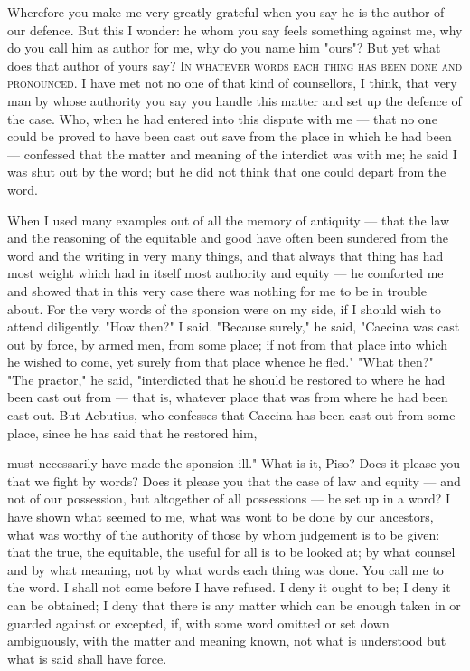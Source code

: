  Wherefore you make me very greatly grateful when you say he is the author of our defence. But this I wonder: he whom you say feels something against me, why do you call him as author for me, why do you name him "ours"? But yet what does that author of yours say? \textsc{In whatever words each thing has been done and pronounced}. I have met not no one of that kind of counsellors, I think, that very man by whose authority you say you handle this matter and set up the defence of the case. Who, when he had entered into this dispute with me --- that no one could be proved to have been cast out save from the place in which he had been --- confessed that the matter and meaning of the interdict was with me; he said I was shut out by the word; but he did not think that one could depart from the word.

 When I used many examples out of all the memory of antiquity --- that the law and the reasoning of the equitable and good have often been sundered from the word and the writing in very many things, and that always that thing has had most weight which had in itself most authority and equity --- he comforted me and showed that in this very case there was nothing for me to be in trouble about. For the very words of the sponsion were on my side, if I should wish to attend diligently. "How then?" I said. "Because surely," he said, "Caecina was cast out by force, by armed men, from some place; if not from that place into which he wished to come, yet surely from that place whence he fled." "What then?" "The praetor," he said, "interdicted that he should be restored to where he had been cast out from --- that is, whatever place that was from where he had been cast out. But Aebutius, who confesses that Caecina has been cast out from some place, since he has said that he restored him,

 must necessarily have made the sponsion ill." What is it, Piso? Does it please you that we fight by words? Does it please you that the case of law and equity --- and not of our possession, but altogether of all possessions --- be set up in a word? I have shown what seemed to me, what was wont to be done by our ancestors, what was worthy of the authority of those by whom judgement is to be given: that the true, the equitable, the useful for all is to be looked at; by what counsel and by what meaning, not by what words each thing was done. You call me to the word. I shall not come before I have refused. I deny it ought to be; I deny it can be obtained; I deny that there is any matter which can be enough taken in or guarded against or excepted, if, with some word omitted or set down ambiguously, with the matter and meaning known, not what is understood but what is said shall have force.

